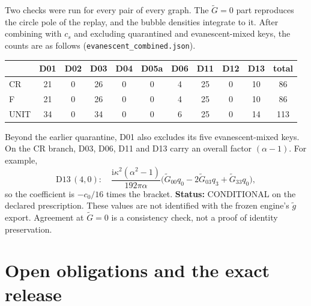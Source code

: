 \documentclass[11pt,a4paper]{article}
\newcommand{\ii}{\mathrm i}
\newcommand{\ka}{\kappa}
\newcommand{\loc}[1]{\nolinkurl{#1}}
\newcommand{\CONDITIONAL}{\textsf{CONDITIONAL}}
\theoremstyle{plain}
\theoremstyle{definition}
\theoremstyle{remark}
\numberwithin{equation}{section}
\begin{document}
Two checks were run for every pair of every graph. The
\(\tilde G=0\) part reproduces the circle pole of the replay, and
the bubble densities integrate to it.
After combining with \(c_s\) and excluding quarantined and
evanescent-mixed keys, the counts are as follows
(\loc{evanescent_combined.json}).
\begin{center}
\small
\begin{tabular}{@{}lccccccccc|c@{}}
\toprule
 & D01 & D02 & D03 & D04 & D05a & D06 & D11 & D12 & D13 & total\\
\midrule
CR & 21 & 0 & 26 & 0 & 0 & 4 & 25 & 0 & 10 & 86\\
F & 21 & 0 & 26 & 0 & 0 & 4 & 25 & 0 & 10 & 86\\
UNIT & 34 & 0 & 34 & 0 & 0 & 6 & 25 & 0 & 14 & 113\\
\bottomrule
\end{tabular}
\end{center}
Beyond the earlier quarantine, D01 also excludes its five
evanescent-mixed keys. On the CR branch, D03, D06, D11 and D13
carry an overall factor \((\alpha-1)\). For example,
\[
 \text{D13}\,(4,0):\quad
 \frac{\ii\ka^2(\alpha^2-1)}{192\pi\alpha}
 \bigl(\tilde G_{00}q_0-2\tilde G_{03}q_3+\tilde G_{33}q_0\bigr),
\]
so the coefficient is \(-c_0/16\) times the bracket.
\textbf{Status:} \CONDITIONAL{} on the declared prescription. These
values are not identified with the frozen engine's \(\tilde g\)
export. Agreement at \(\tilde G=0\) is a consistency check, not a
proof of identity preservation.

\section{Open obligations and the exact release}
\label{sec:release}
\end{document}
